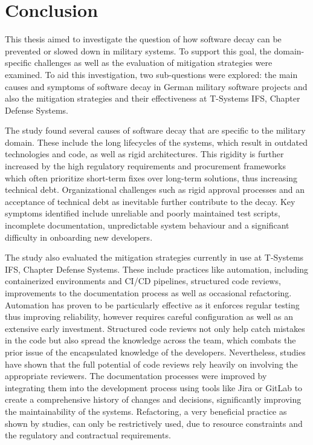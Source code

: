 \section{Conclusion}
This thesis aimed to investigate the question of how software decay can be prevented or slowed down in military systems. To support this goal, the domain-specific challenges as well as the evaluation of mitigation strategies were examined.
To aid this investigation, two sub-questions were explored: the main causes and symptoms of software decay in German military software projects and also the mitigation strategies and their effectiveness at T-Systems IFS, Chapter Defense Systems.

The study found several causes of software decay that are specific to the military domain. These include the long lifecycles of the systems, which result in outdated technologies and code, as well as rigid architectures. This rigidity is further
increased by the high regulatory requirements and procurement frameworks which often prioritize short-term fixes over long-term solutions, thus increasing technical debt. Organizational challenges such as rigid approval processes
and an acceptance of technical debt as inevitable further contribute to the decay. Key symptoms identified include unreliable and poorly maintained test scripts, incomplete documentation, unpredictable system behaviour and a significant difficulty in onboarding new developers.

The study also evaluated the mitigation strategies currently in use at T-Systems IFS, Chapter Defense Systems. These include practices like automation, including containerized environments and CI/CD pipelines,
structured code reviews, improvements to the documentation process as well as occasional refactoring. Automation has proven to be particularly effective as it enforces regular testing thus improving reliability, however requires careful configuration as well as an extensive early investment.
Structured code reviews not only help catch mistakes in the code but also spread the knowledge across the team, which combats the prior issue of the encapsulated knowledge of the developers. Nevertheless, studies have shown that the full potential of code reviews rely heavily on involving the appropriate reviewers.
The documentation processes were improved by integrating them into the development process using tools like Jira or GitLab to create a comprehensive history of changes and decisions, significantly improving the maintainability of the systems.
Refactoring, a very beneficial practice as shown by studies, can only be restrictively used, due to resource constraints and the regulatory and contractual requirements.

